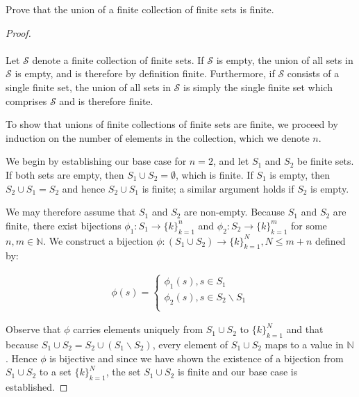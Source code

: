 Prove that the union of a finite collection of finite sets is finite. 

\begin{proof}\ \\\\

    Let $\mathcal{S}$ denote a finite collection of finite sets. If $\mathcal{S}$ is empty, the union of all sets in
    $\mathcal{S}$ is empty, and is therefore by definition finite. Furthermore, if $\mathcal{S}$ consists
    of a single finite set, the union of all sets in $\mathcal{S}$ is simply the single finite set which comprises 
    $\mathcal{S}$ and is therefore finite.

    To show that unions of finite collections of finite sets are finite, we proceed by induction on
    the number of elements in the collection, which we denote $n$.

    We begin by establishing our base case for $n = 2$, and let $S_1$ and $S_2$ be finite sets.
    If both sets are empty, then $S_1 \cup S_2 = \emptyset$, which is finite. If $S_1$ is empty,
    then $S_2 \cup S_1 = S_2$ and hence $S_2 \cup S_1$ is finite; a similar
    argument holds if $S_2$ is empty.

    We may therefore assume that $S_1$ and $S_2$ are non-empty. Because $S_1$
    and $S_2$ are finite, there exist bijections $\phi_1:S_1 \to \{k\}_{k=1}^n$
    and $\phi_2:S_2 \to \{k\}_{k=1}^m$ for some $n, m \in \mathbb{N}$. We construct a 
    bijection $\phi:(S_1 \cup S_2) \to \{k\}_{k=1}^N, N \le m+n$
    defined by:
    
    \begin{align*}
        \phi(s) = \begin{cases}
            \phi_1(s), s \in S_1 \\
            \phi_2(s), s \in S_2 \backslash S_1 \\
        \end{cases}
    \end{align*}

    Observe that $\phi$ carries elements uniquely from $S_1 \cup S_2$ to $\{k\}_{k=1}^N$ and
    that because $S_1 \cup S_2 = S_2 \cup (S_1 \backslash S_2)$, every element of $S_1 \cup S_2$ 
    maps to a value in $\mathbb{N}$. Hence $\phi$ is bijective and since we have shown
    the existence of a bijection from $S_1 \cup S_2$ to a set $\{k\}_{k=1}^N$, the set $S_1 \cup S_2$ is finite
    and our base case is established. 


\end{proof}

